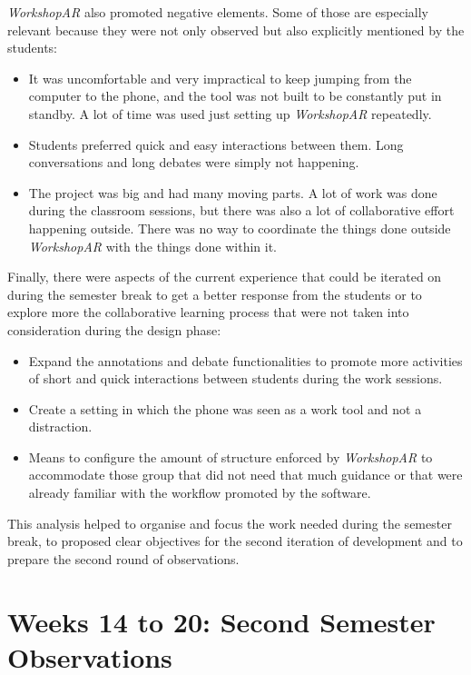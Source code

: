 \emph{WorkshopAR} also promoted negative elements. Some of those are especially relevant because they were not only observed but also explicitly mentioned by the students:

\begin{itemize}
    \item It was uncomfortable and very impractical to keep jumping from the computer to the phone, and the tool was not built to be constantly put in standby. A lot of
    time was used just setting up \emph{WorkshopAR} repeatedly.
    \item Students preferred quick and easy interactions between them. Long conversations and long debates were simply not happening.
    \item The project was big and had many moving parts. A lot of work was done during the classroom sessions, but there was also a lot of collaborative effort happening
    outside. There was no way to coordinate the things done outside \emph{WorkshopAR} with the things done within it.
\end{itemize}

Finally, there were aspects of the current experience that could be iterated on during the semester break to get a better response from the students or to explore more the
collaborative learning process that were not taken into consideration during the design phase:

\begin{itemize}
    \item Expand the annotations and debate functionalities to promote more activities of short and quick interactions between students during the work sessions.
    \item Create a setting in which the phone was seen as a work tool and not a distraction.
    \item Means to configure the amount of structure enforced by \emph{WorkshopAR} to accommodate those group that did not need that much guidance or that were already
    familiar with the workflow promoted by the software.
\end{itemize}

This analysis helped to organise and focus the work needed during the semester break, to proposed clear objectives for the second iteration of development and to prepare
the second round of observations.

\section{Weeks 14 to 20: Second Semester Observations \label{sec:6-8}}

